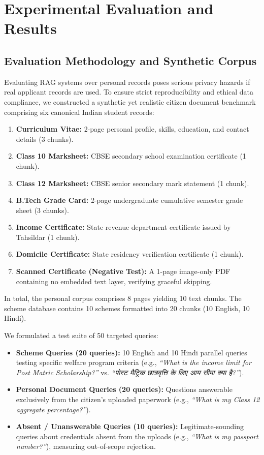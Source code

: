 \documentclass[conference]{IEEEtran}
\begin{document}
\section{Experimental Evaluation and Results}

\subsection{Evaluation Methodology and Synthetic Corpus}
Evaluating RAG systems over personal records poses serious privacy hazards if real applicant records are used. To ensure strict reproducibility and ethical data compliance, we constructed a synthetic yet realistic citizen document benchmark comprising six canonical Indian student records:
\begin{enumerate}
    \item \textbf{Curriculum Vitae:} 2-page personal profile, skills, education, and contact details (3 chunks).
    \item \textbf{Class 10 Marksheet:} CBSE secondary school examination certificate (1 chunk).
    \item \textbf{Class 12 Marksheet:} CBSE senior secondary mark statement (1 chunk).
    \item \textbf{B.Tech Grade Card:} 2-page undergraduate cumulative semester grade sheet (3 chunks).
    \item \textbf{Income Certificate:} State revenue department certificate issued by Tahsildar (1 chunk).
    \item \textbf{Domicile Certificate:} State residency verification certificate (1 chunk).
    \item \textbf{Scanned Certificate (Negative Test):} A 1-page image-only PDF containing no embedded text layer, verifying graceful skipping.
\end{enumerate}
In total, the personal corpus comprises 8 pages yielding 10 text chunks. The scheme database contains 10 schemes formatted into 20 chunks (10 English, 10 Hindi). 

We formulated a test suite of 50 targeted queries:
\begin{itemize}
    \item \textbf{Scheme Queries (20 queries):} 10 English and 10 Hindi parallel queries testing specific welfare program criteria (e.g., \textit{``What is the income limit for Post Matric Scholarship?''} vs. \textit{``पोस्ट मैट्रिक छात्रवृत्ति के लिए आय सीमा क्या है?''}).
    \item \textbf{Personal Document Queries (20 queries):} Questions answerable exclusively from the citizen's uploaded paperwork (e.g., \textit{``What is my Class 12 aggregate percentage?''}).
    \item \textbf{Absent / Unanswerable Queries (10 queries):} Legitimate-sounding queries about credentials absent from the uploads (e.g., \textit{``What is my passport number?''}), measuring out-of-scope rejection.
\end{itemize}
\end{document}
